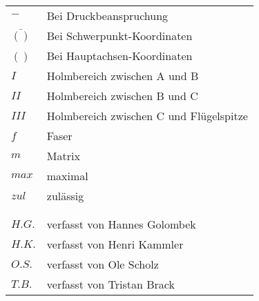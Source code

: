 \begin{longtable}{ll}
$ - $&Bei Druckbeanspruchung\\
$ \bar{()} $&Bei Schwerpunkt-Koordinaten\\
$ \hat{()} $&Bei Hauptachsen-Koordinaten\\
$ I $ &Holmbereich zwischen A und B\\
$ II $ &Holmbereich zwischen B und C\\
$ III $ &Holmbereich zwischen C und Flügelspitze\\
$ f $&Faser\\
$ m $&Matrix\\
$ max$& maximal\\
$ zul $&zulässig\\
& \\
& \\
$H.G.$& verfasst von Hannes Golombek\\
$H.K.$& verfasst von Henri Kammler\\
$O.S.$& verfasst von Ole Scholz\\
$T.B.$& verfasst von Tristan Brack\\
\end{longtable}

